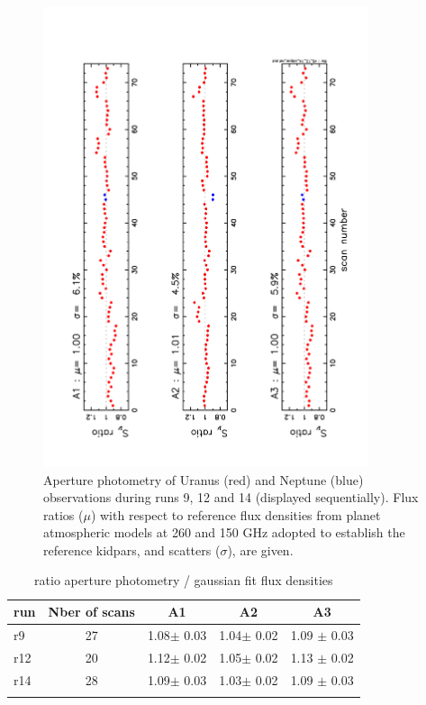 \begin{figure}[ht!]
  \begin{center}
    \includegraphics[clip=true,angle=-90.,width=0.85\textwidth]{Figures/Aperture_photo/Flux_ratio_index_A1_A2_A3_r9_r12_r14.pdf}
    \caption{Aperture photometry of Uranus (red) and Neptune (blue) observations during runs 9, 12 and 14 (displayed sequentially). Flux ratios ($\mu$) with respect to
reference flux densities from planet atmospheric models at 260 and 150 GHz adopted to establish the  reference kidpars,  and scatters ($\sigma$), are given.}
    \label{fig:Uranus_s308}
  \end{center}
\end{figure}



\begin{table}[!h]
\caption{ratio aperture photometry / gaussian fit flux densities   }
\label{tab:ratio}
\centering
\begin{tabular}{l| c | c c c }
\hline\hline
\noalign{\smallskip}
run     & Nber of scans  &  A1    &    A2   &  A3    \\
\hline
r9    & 27  &  1.08$\pm$ 0.03    &  1.04$\pm$ 0.02 & 1.09 $\pm$ 0.03     \\
r12   & 20  &  1.12$\pm$ 0.02    &  1.05$\pm$ 0.02 & 1.13 $\pm$ 0.02     \\
r14   & 28  &  1.09$\pm$ 0.03    &  1.03$\pm$ 0.02 & 1.09 $\pm$ 0.03     \\
\noalign{\smallskip}
\hline
\end{tabular}
\end{table}
